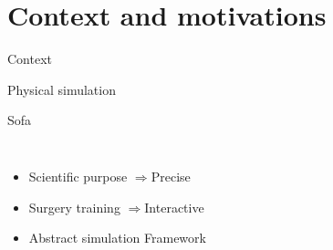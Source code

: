 \documentclass[xcolor={usenames,dvipsnames}]{beamer}
\newcommand{\sectiontitle}{}
\newcommand{\newsection}[1]{\renewcommand{\sectiontitle}{#1}\section{#1}}
\begin{document}
\newsection{Context and motivations}
\begin{frame}{Context}
    \begin{block}{Physical simulation}
        \hfill
        \parbox[c][.26\textheight][t]{.98\textwidth}{
        }
    \end{block}
    \pause
    \pause
    \pause
    \pause
    \begin{alertblock}{Sofa \cite{Allard07SOFA,Faure11Sparse,Nesme09Preserving}}
        \begin{columns}
            \begin{itemize}[<+->]
                \item Scientific purpose $\Rightarrow$\alert{Precise}
                \item Surgery training $\Rightarrow$\alert{Interactive} 
                \item \alert{Abstract} simulation Framework

\end{itemize}
\end{columns}
\end{alertblock}
\end{frame}
\end{document}
